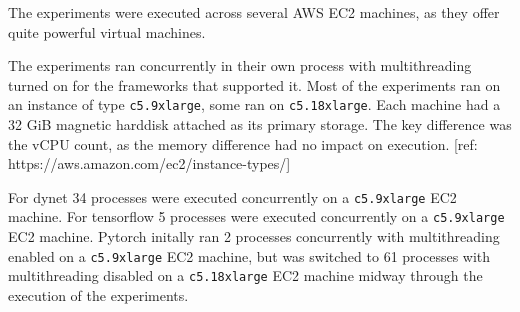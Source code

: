 
The experiments were executed across several AWS EC2 machines, as they offer
quite powerful virtual machines.

The experiments ran concurrently in their own process with multithreading
turned on for the frameworks that supported it. Most of the experiments ran on
an instance of type \texttt{c5.9xlarge}, some ran on \texttt{c5.18xlarge}.
Each machine had a 32 GiB magnetic harddisk attached as its primary storage.
The key difference was the vCPU count, as the memory difference had no
impact on execution.
[ref: https://aws.amazon.com/ec2/instance-types/]

For dynet 34 processes were executed concurrently on a \texttt{c5.9xlarge} EC2
machine.
For tensorflow 5 processes were executed concurrently on a \texttt{c5.9xlarge}
EC2 machine.
Pytorch initally ran 2 processes concurrently with multithreading enabled on a
\texttt{c5.9xlarge} EC2 machine, but was switched to 61 processes with
multithreading disabled on a \texttt{c5.18xlarge} EC2 machine midway through the
execution of the experiments.



